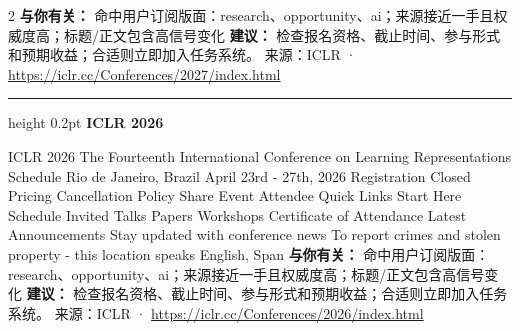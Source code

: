 \documentclass[10.5pt]{ctexart}
\begin{document}
\begin{multicols}{2}
\textbf{与你有关：} 命中用户订阅版面：research、opportunity、ai；来源接近一手且权威度高；标题/正文包含高信号变化
\textbf{建议：} 检查报名资格、截止时间、参与形式和预期收益；合适则立即加入任务系统。
{\footnotesize\color{ormuted} 来源：ICLR · \url{https://iclr.cc/Conferences/2027/index.html}}
\vspace{2mm}
\hrule height 0.2pt
\vspace{2mm}
{\large\bfseries ICLR 2026}\par
ICLR 2026 The Fourteenth International Conference on Learning Representations Schedule Rio de Janeiro, Brazil April 23rd - 27th, 2026 Registration Closed Pricing Cancellation Policy Share Event Attendee Quick Links Start Here Schedule Invited Talks Papers Workshops Certificate of Attendance Latest Announcements Stay updated with conference news To report crimes and stolen property - this location speaks English, Span
\textbf{与你有关：} 命中用户订阅版面：research、opportunity、ai；来源接近一手且权威度高；标题/正文包含高信号变化
\textbf{建议：} 检查报名资格、截止时间、参与形式和预期收益；合适则立即加入任务系统。
{\footnotesize\color{ormuted} 来源：ICLR · \url{https://iclr.cc/Conferences/2026/index.html}}
\end{multicols}
\end{document}
